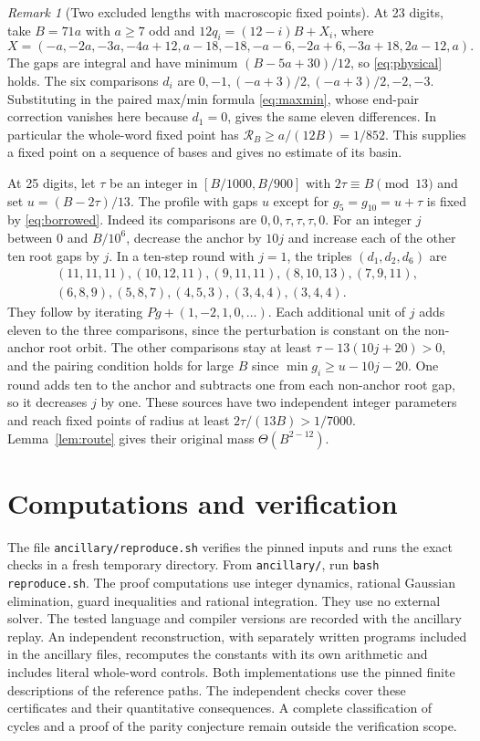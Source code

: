 \documentclass[11pt,reqno]{amsart}
\theoremstyle{remark}
\newtheorem*{remark}{Remark}
\newcommand{\file}[1]{\nolinkurl{#1}}
\begin{document}
\begin{remark}[Two excluded lengths with macroscopic fixed points]
At 23 digits, take \(B=71a\) with \(a\ge7\) odd and
\(12q_i=(12-i)B+X_i\), where
\[
 X=(-a,-2a,-3a,-4a+12,a-18,-18,-a-6,-2a+6,-3a+18,2a-12,a).
\]
The gaps are integral and have minimum \((B-5a+30)/12\), so
\eqref{eq:physical} holds. The six comparisons \(d_i\) are
\(0,-1,(-a+3)/2,(-a+3)/2,-2,-3\).
Substituting in the paired max/min formula \eqref{eq:maxmin}, whose
end-pair correction vanishes here because \(d_1=0\), gives the same
eleven differences. In
particular the whole-word fixed point has
\(\mathcal R_B\ge a/(12B)=1/852\). This supplies a fixed point
on a sequence of bases and gives no estimate of its basin.

At 25 digits, let \(\tau\) be an integer in
\([B/1000,B/900]\) with \(2\tau\equiv B\pmod{13}\) and set
\(u=(B-2\tau)/13\). The profile with gaps \(u\) except for
\(g_5=g_{10}=u+\tau\) is fixed by \eqref{eq:borrowed}.
Indeed its comparisons are \(0,0,\tau,\tau,\tau,0\).
For an integer \(j\) between 0 and \(B/10^6\), decrease the
anchor by \(10j\) and increase each of the other ten root
gaps by \(j\). In a ten-step round with \(j=1\), the triples
\((d_1,d_2,d_6)\) are
\[
\begin{gathered}
(11,11,11),(10,12,11),(9,11,11),(8,10,13),(7,9,11),\\
(6,8,9),(5,8,7),(4,5,3),(3,4,4),(3,4,4).
\end{gathered}
\]
They follow by iterating \(Pg+(1,-2,1,0,\ldots)\).
Each additional unit of \(j\) adds eleven to the three
comparisons, since the perturbation is constant on the
non-anchor root orbit. The other comparisons stay at least
\(\tau-13(10j+20)>0\), and the pairing condition holds for
large \(B\) since \(\min g_i\ge u-10j-20\).
One round adds ten to the anchor and subtracts one from each
non-anchor root gap, so it decreases \(j\) by one.
These sources have two independent integer parameters and
reach fixed points of radius at least \(2\tau/(13B)>1/7000\).
Lemma~\ref{lem:route} gives their original mass
\(\Theta(B^{2-12})\).
\end{remark}

\section{Computations and verification}\label{sec:verification}

The file \file{ancillary/reproduce.sh} verifies the pinned inputs
and runs the exact checks in a fresh temporary directory.
From \file{ancillary/}, run \texttt{bash reproduce.sh}.
The proof computations use integer dynamics, rational Gaussian
elimination, guard inequalities and rational integration. They
use no external solver. The tested language and compiler
versions are recorded with the ancillary replay.
An independent reconstruction, with separately written programs
included in the ancillary files, recomputes the constants with its own
arithmetic and includes literal whole-word controls. Both implementations use
the pinned finite descriptions of the reference paths. The independent
checks cover these certificates and their quantitative consequences.
A complete classification of cycles and a proof of the parity
conjecture remain outside the verification scope.
\end{document}
